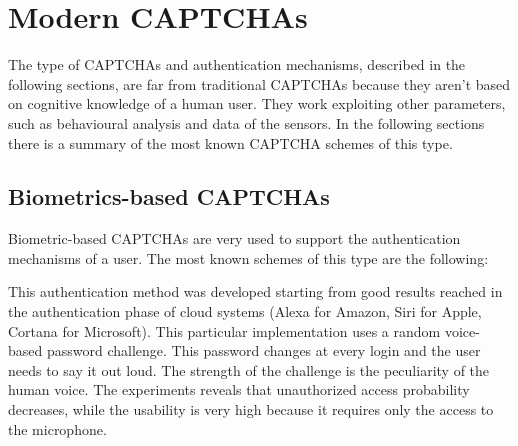 \section{Modern CAPTCHAs}
The type of CAPTCHAs and authentication mechanisms, described in the following sections, are far from traditional CAPTCHAs because they aren't based on cognitive knowledge of a human user. They work exploiting other parameters, such as behavioural analysis and data of the sensors. In the following sections there is a summary of the most known CAPTCHA schemes of this type.

\subsection{Biometrics-based CAPTCHAs}\label{soa:Bio_CAPTCHA}
Biometric-based CAPTCHAs are very used to support the authentication mechanisms of a user. The most known schemes of this type are the following:
\begin{itemize}
{This authentication method was developed starting from good results reached in the authentication phase of cloud systems\cite{voice_CAPTCHA} (Alexa for Amazon, Siri for Apple, Cortana for Microsoft). This particular implementation uses a random voice-based password challenge. This password changes at every login and the user needs to say it out loud. The strength of the challenge is the peculiarity of the human voice. The experiments reveals that unauthorized access probability decreases, while the usability is very high because it requires only the access to the microphone.}
\end{itemize}

